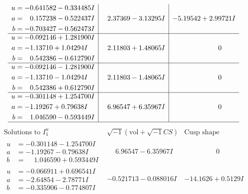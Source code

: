 \documentclass[1p]{elsarticle_modified}
\theoremstyle{definition}
\newcommand{\I}{\sqrt{-1}}
\begin{document}
$$\begin{array}{c|c|c}
\begin{aligned}
u &= -0.641582 - 0.334485 I \\
a &= \phantom{-}0.157238 - 0.522437 I \\
b &= -0.703427 - 0.562473 I\end{aligned}
 & \phantom{-}2.37369 - 3.13295 I & -5.19542 + 2.99721 I \\ \hline\begin{aligned}
u &= -0.092146 + 1.281900 I \\
a &= -1.13710 + 1.04294 I \\
b &= \phantom{-}0.542386 - 0.612790 I\end{aligned}
 & \phantom{-}2.11803 + 1.48065 I & \phantom{-0.000000 } 0 \\ \hline\begin{aligned}
u &= -0.092146 - 1.281900 I \\
a &= -1.13710 - 1.04294 I \\
b &= \phantom{-}0.542386 + 0.612790 I\end{aligned}
 & \phantom{-}2.11803 - 1.48065 I & \phantom{-0.000000 } 0 \\ \hline\begin{aligned}
u &= -0.301148 + 1.254700 I \\
a &= -1.19267 + 0.79638 I \\
b &= \phantom{-}1.046590 - 0.593449 I\end{aligned}
 & \phantom{-}6.96547 + 6.35967 I & \phantom{-0.000000 } 0\\
 \hline 
 \end{array}$$\newpage$$\begin{array}{c|c|c}  
\text{Solutions to }I^u_{1}& \I (\text{vol} + \sqrt{-1}CS) & \text{Cusp shape}\\
 \hline 
\begin{aligned}
u &= -0.301148 - 1.254700 I \\
a &= -1.19267 - 0.79638 I \\
b &= \phantom{-}1.046590 + 0.593449 I\end{aligned}
 & \phantom{-}6.96547 - 6.35967 I & \phantom{-0.000000 } 0 \\ \hline\begin{aligned}
u &= -0.066911 + 0.696541 I \\
a &= -2.64854 - 2.78771 I \\
b &= -0.335906 - 0.774807 I\end{aligned}
 & -0.521713 - 0.088016 I & -14.1626 + 0.5129 I \\ \hline\begin{aligned}

\end{aligned}
\end{array}$$
\end{document}
